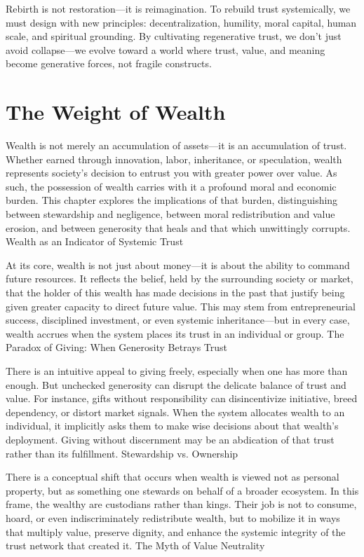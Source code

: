 \documentclass[11pt,oneside]{book}
\begin{document}
Rebirth is not restoration—it is reimagination. To rebuild trust systemically, we must design with new principles: decentralization, humility, moral capital, human scale, and spiritual grounding. By cultivating regenerative trust, we don't just avoid collapse—we evolve toward a world where trust, value, and meaning become generative forces, not fragile constructs.


\chapter{The Weight of Wealth}

Wealth is not merely an accumulation of assets—it is an accumulation of trust. Whether earned through innovation, labor, inheritance, or speculation, wealth represents society’s decision to entrust you with greater power over value. As such, the possession of wealth carries with it a profound moral and economic burden. This chapter explores the implications of that burden, distinguishing between stewardship and negligence, between moral redistribution and value erosion, and between generosity that heals and that which unwittingly corrupts.
Wealth as an Indicator of Systemic Trust

At its core, wealth is not just about money—it is about the ability to command future resources. It reflects the belief, held by the surrounding society or market, that the holder of this wealth has made decisions in the past that justify being given greater capacity to direct future value. This may stem from entrepreneurial success, disciplined investment, or even systemic inheritance—but in every case, wealth accrues when the system places its trust in an individual or group.
The Paradox of Giving: When Generosity Betrays Trust

There is an intuitive appeal to giving freely, especially when one has more than enough. But unchecked generosity can disrupt the delicate balance of trust and value. For instance, gifts without responsibility can disincentivize initiative, breed dependency, or distort market signals. When the system allocates wealth to an individual, it implicitly asks them to make wise decisions about that wealth’s deployment. Giving without discernment may be an abdication of that trust rather than its fulfillment.
Stewardship vs. Ownership

There is a conceptual shift that occurs when wealth is viewed not as personal property, but as something one stewards on behalf of a broader ecosystem. In this frame, the wealthy are custodians rather than kings. Their job is not to consume, hoard, or even indiscriminately redistribute wealth, but to mobilize it in ways that multiply value, preserve dignity, and enhance the systemic integrity of the trust network that created it.
The Myth of Value Neutrality
\end{document}
